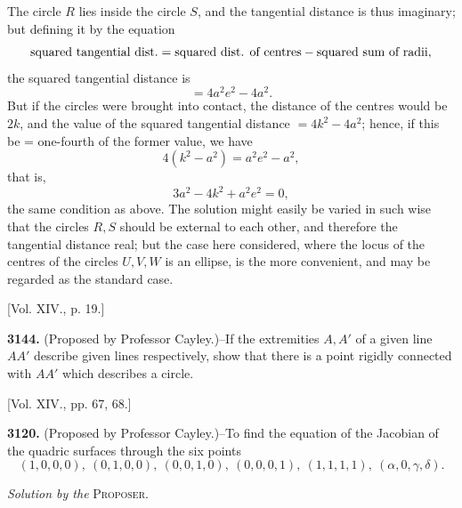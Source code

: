 \documentclass[10pt]{article}
\begin{document}
The circle $R$ lies inside the circle $S$, and the tangential distance is thus
imaginary; but defining it by the equation
\[
\hbox{squared tangential dist.}=
\hbox{squared dist. of centres}-\hbox{squared sum of radii},
\]
the squared tangential distance is
\[
        =4a^2e^2-4a^2.
\]
But if the circles were brought into contact, the distance of the centres would
be $2k$, and the value of the squared tangential distance $=4k^2-4a^2$; hence,
if this be = one-fourth of the former value, we have
\[
        4(k^2-a^2)=a^2e^2-a^2,
\]
that is,
\[
        3a^2-4k^2+a^2e^2=0,
\]
the same condition as above. The solution might easily be varied in such wise
that the circles $R,S$ should be external to each other, and therefore the
tangential distance real; but the case here considered, where the locus of the
centres of the circles $U,V,W$ is an ellipse, is the more convenient, and may be
regarded as the standard case.

\begin{center}
[Vol. XIV., p. 19.]
\end{center}

\noindent
\textbf{3144.} (Proposed by Professor Cayley.)--If the extremities $A,A'$ of a
given line $AA'$ describe given lines respectively, show that there is a point
rigidly connected with $AA'$ which describes a circle.

\begin{center}
[Vol. XIV., pp. 67, 68.]
\end{center}

\noindent
\textbf{3120.} (Proposed by Professor Cayley.)--To find the equation of the
Jacobian of the quadric surfaces through the six points
\[
(1,0,0,0),\ (0,1,0,0),\ (0,0,1,0),\ (0,0,0,1),\ (1,1,1,1),\ (\alpha,0,\gamma,\delta).
\]

\begin{center}
\emph{Solution by the} \textsc{Proposer}.
\end{center}
\end{document}
